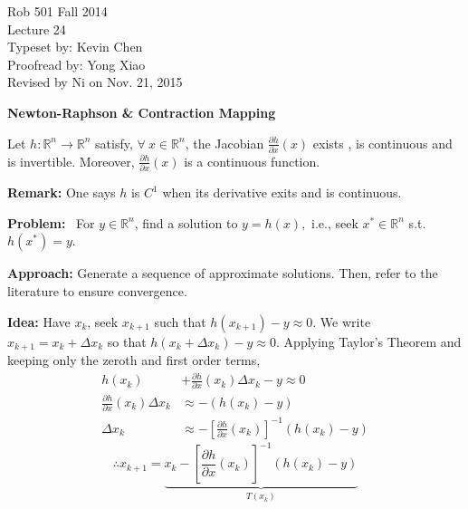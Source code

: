 \documentclass[letterpaper]{article}
\newcommand{\real}{\mathbb R}  %
\begin{document}
\baselineskip=48pt  %


\setlength{\parskip}{.3in}
\setlength{\itemsep}{.3in}

\pagestyle{plain}

{\Large \bf
\begin{center}
Rob 501 Fall 2014\\
Lecture 24\\
Typeset by:  Kevin Chen\\
Proofread by: Yong Xiao\\
Revised by Ni on Nov. 21, 2015
\end{center}
}

\Large

\begin{center}
    \textbf{Newton-Raphson \& Contraction Mapping}
\end{center}

\noindent Let $h : \real^n\to\real^n$  satisfy, $\forall~x \in \real^n$, the Jacobian $\frac{\partial h}{\partial x} \left( x \right)$ exists , is continuous and is invertible. Moreover, $\frac{\partial h}{\partial x}\left( x \right)$ is a continuous function.

\noindent \textbf{Remark:} One says $h$ is $C^1$ when its derivative exits and is continuous.

\noindent \textbf{Problem:}~ For $y \in \real^n$, find a solution to $y=h\left(x\right), $  i.e., seek $x^* \in \real^n$ s.t. $h\left(x^*\right) = y$.

\noindent \textbf{Approach:} Generate a sequence of approximate solutions. Then, refer to the literature to ensure convergence.

\textbf{Idea:} Have $x_k$, seek $x_{k+1}$ such that $h\left(x_{k+1}\right)-y \approx 0$. We write $x_{k+1} = x_k + \Delta x_k$ so that  $h\left(x_k+\Delta x_k\right)-y \approx 0$.  Applying Taylor's Theorem and keeping only the zeroth and first order terms,
    \begin{align*}
        h\left(x_k\right)&+\frac{\partial h}{\partial x}\left(x_k\right)\Delta x_k - y \approx 0\\
        \frac{\partial h}{\partial x}\left(x_k\right)\Delta x_k &\approx  -\left(h\left(x_k\right)-y\right)\\
        \Delta x_k &\approx -\left[\frac{\partial h}{\partial x}\left(x_k\right)\right]^{-1}\left(h\left(x_k\right)-y\right)
    \end{align*}
    $$\therefore x_{k+1} = \underbrace{x_k-\left[\frac{\partial h}{\partial x}\left(x_k\right)\right]^{-1}\left(h\left(x_k\right)-y\right)}_{T\left(x_k\right)}$$
    \newpage
\end{document}

